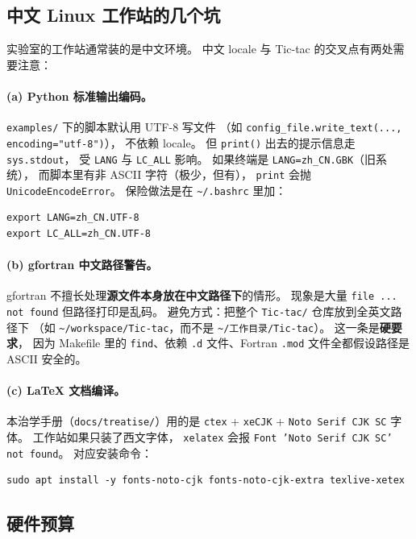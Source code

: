 \subsection{中文 Linux 工作站的几个坑}
\label{sec:ch20-env-cnlocale}

实验室的工作站通常装的是中文环境。
中文 locale 与 Tic-tac 的交叉点有两处需要注意：

\paragraph{(a) Python 标准输出编码。}
\texttt{examples/} 下的脚本默认用 UTF-8 写文件
（如 \texttt{config\_file.write\_text(..., encoding="utf-8")}），
不依赖 locale。
但 \texttt{print()} 出去的提示信息走 \texttt{sys.stdout}，
受 \texttt{LANG} 与 \texttt{LC\_ALL} 影响。
如果终端是 \texttt{LANG=zh\_CN.GBK}（旧系统），
而脚本里有非 ASCII 字符（极少，但有），
\texttt{print} 会抛 \texttt{UnicodeEncodeError}。
保险做法是在 \texttt{\textasciitilde/.bashrc} 里加：
\begin{lstlisting}[style=config]
export LANG=zh_CN.UTF-8
export LC_ALL=zh_CN.UTF-8
\end{lstlisting}

\paragraph{(b) gfortran 中文路径警告。}
gfortran 不擅长处理\textbf{源文件本身放在中文路径下}的情形。
现象是大量 \texttt{file ... not found} 但路径打印是乱码。
避免方式：把整个 \texttt{Tic-tac/} 仓库放到全英文路径下
（如 \texttt{\textasciitilde/workspace/Tic-tac}，而不是 \texttt{\textasciitilde/工作目录/Tic-tac}）。
这一条是\textbf{硬要求}，
因为 Makefile 里的 \texttt{find}、依赖 \texttt{.d} 文件、Fortran \texttt{.mod} 文件全都假设路径是 ASCII 安全的。

\paragraph{(c) LaTeX 文档编译。}
本治学手册（\texttt{docs/treatise/}）用的是 \texttt{ctex} + \texttt{xeCJK} + \texttt{Noto Serif CJK SC} 字体。
工作站如果只装了西文字体，
\texttt{xelatex} 会报 \texttt{Font 'Noto Serif CJK SC' not found}。
对应安装命令：
\begin{lstlisting}[style=config]
sudo apt install -y fonts-noto-cjk fonts-noto-cjk-extra texlive-xetex
\end{lstlisting}

\subsection{硬件预算}
\label{sec:ch20-env-hw}

